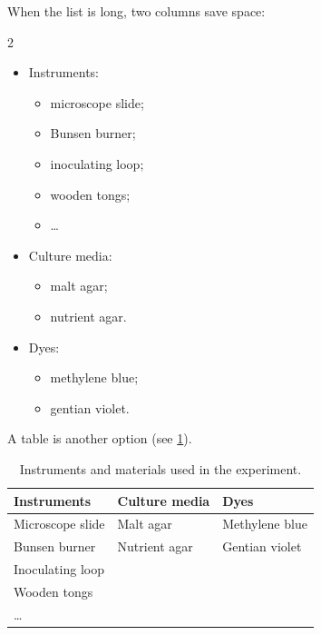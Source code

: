 When the list is long, two columns save space:
\begin{multicols}{2}
    \begin{itemize}
        \item Instruments:
              \begin{itemize}
                  \item microscope slide;
                  \item Bunsen burner;
                  \item inoculating loop;
                  \item wooden tongs;
                  \item \dots
              \end{itemize}
        \item Culture media:
              \begin{itemize}
                  \item malt agar;
                  \item nutrient agar.
              \end{itemize}
        \item Dyes:
              \begin{itemize}
                  \item methylene blue;
                  \item gentian violet.
              \end{itemize}
    \end{itemize}
\end{multicols}

A table is another option (see \cref{tab:instruments}).
\begin{table}[ht]
    \centering
    \begin{tabular}{lll}
        \toprule
        \textbf{Instruments} & \textbf{Culture media} & \textbf{Dyes}  \\
        \midrule
        Microscope slide     & Malt agar              & Methylene blue \\
        Bunsen burner        & Nutrient agar          & Gentian violet \\
        Inoculating loop     &                        &                \\
        Wooden tongs         &                        &                \\
        \dots                &                        &                \\
        \bottomrule
    \end{tabular}
    \caption{Instruments and materials used in the experiment.}
    \label{tab:instruments}
\end{table}
